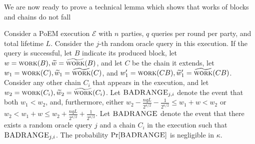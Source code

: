 We are now ready to prove a technical lemma which shows that works
of blocks and chains do not fall

\begin{lemma}\label{lem:good-ranges}
  Consider a PoEM execution $\mathcal{E}$ with $n$ parties, $q$ queries per round per party,
  and total lifetime $L$.
  Consider the $j$-th random oracle query in this execution.
  If the query is successful, let $B$ indicate its produced block, let
  $w = \textsc{work}(B), \widetilde{w} = \widetilde{\textsc{work}}(B)$, and let $C$ be the
  chain it extends, let $w_1 = \textsc{work}(C), \widetilde{w}_1 = \widetilde{\textsc{work}}(C)$, and
  $w_1' = \textsc{work}(CB), \widetilde{w}_1' = \widetilde{\textsc{work}}(CB)$. Consider any other chain $C_i$ that appears in the
  execution, and let $w_2 = \textsc{work}(C_i), \widetilde{w}_2 = \widetilde{\textsc{work}}(C_i)$.
  Let $\textsc{BADRANGE}_{j,i}$ denote the event that both
  $w_1 < w_2$, and, furthermore, either
  $w_2 - \frac{nqL}{2^{\kappa/2}} - \frac{1}{2^{\kappa/2}} \leq w_1 + w < w_2$ or
  $w_2 < w_1 + w \leq w_2 + \frac{nqL}{2^{\kappa/2}} + \frac{1}{2^{\kappa/2}}$.
  Let $\textsc{BADRANGE}$ denote the event that there exists a random oracle query $j$
  and a chain $C_i$ in the execution such that $\textsc{BADRANGE}_{j,i}$.
  The probability $\Pr[\textsc{BADRANGE}]$ is negligible in $\kappa$.
\end{lemma}
